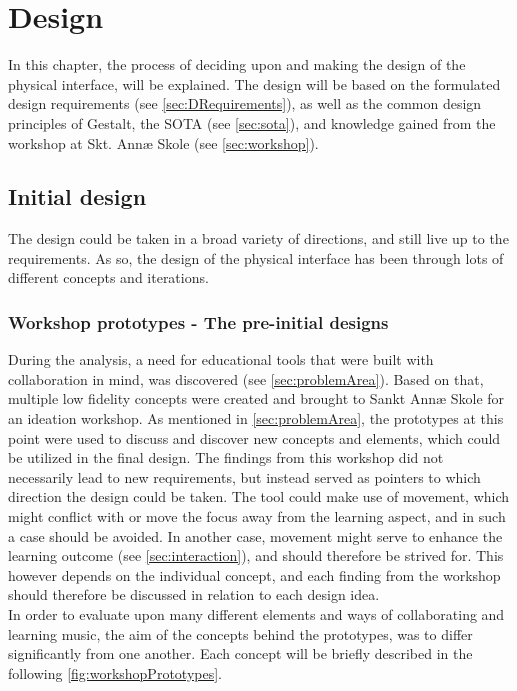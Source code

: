 \chapter{Design}

In this chapter, the process of deciding upon and making the design of the physical interface, will be explained. The design will be based on the formulated design requirements (see \autoref{sec:DRequirements}), as well as the common design principles of Gestalt\cite{gestalt}, the SOTA (see \autoref{sec:sota}), and knowledge gained from the workshop at Skt. Annæ Skole (see \autoref{sec:workshop}). 


\section{Initial design}
 The design could be taken in a broad variety of directions, and still live up to the requirements. As so, the design of the physical interface has been through lots of different concepts and iterations. 

\subsection {Workshop prototypes - The pre-initial designs}

During the analysis, a need for educational tools that were built with collaboration in mind, was discovered (see \autoref{sec:problemArea}). Based on that, multiple low fidelity concepts were created and brought to Sankt Annæ Skole for an ideation workshop. As mentioned in \autoref{sec:problemArea}, the prototypes at this point were used to discuss and discover new concepts and elements, which could be utilized in the final design. The findings from this workshop did not necessarily lead to new requirements, but instead served as pointers to which direction the design could be taken. The tool could make use of movement, which might conflict with or move the focus away from the learning aspect, and in such a case should be avoided. In another case, movement might serve to enhance the learning outcome (see \autoref{sec:interaction}), and should therefore be strived for. This however depends on the individual concept, and each finding from the workshop should therefore be discussed in relation to each design idea.\\

In order to evaluate upon many different elements and ways of collaborating and learning music, the aim of the concepts behind the prototypes, was to differ significantly from one another. Each concept will be briefly described in the following \autoref{fig:workshopPrototypes}.

